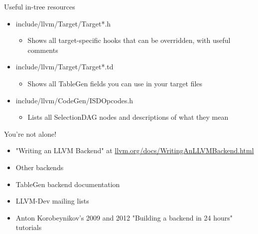 
\begin{frame}{Useful in-tree resources}

\begin{itemize}
    \item include/llvm/Target/Target*.h
    \begin{itemize}
        \item Shows all target-specific hooks that can be overridden, with useful comments
    \end{itemize}
    \item include/llvm/Target/Target*.td
    \begin{itemize}
        \item Shows all TableGen fields you can use in your target files
    \end{itemize}
    \item include/llvm/CodeGen/ISDOpcodes.h
    \begin{itemize}
        \item Lists all SelectionDAG nodes and descriptions of what they mean
    \end{itemize}
\end{itemize}

\end{frame}


\begin{frame}{You're not alone!}

\begin{itemize}
    \item "Writing an LLVM Backend" at \url{llvm.org/docs/WritingAnLLVMBackend.html}
    \item Other backends 
    \item TableGen backend documentation
    \item LLVM-Dev mailing lists
    \item Anton Korobeynikov's 2009 and 2012 "Building a backend in 24 hours" tutorials
\end{itemize}

\end{frame}

